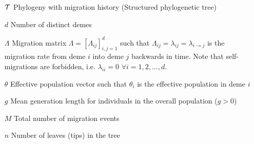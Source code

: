 \begin{itemize}
	\item[$\mathcal{T}$] Phylogeny with migration history (Structured phylogenetic tree)
	\item[$d$] Number of distinct demes
	\item[$\Lambda$] Migration matrix $\Lambda = [\Lambda_{ij}]_{i,j=1}^d$ such that $\Lambda_{ij} = \lambda_{ij} = \lambda_{i \rightarrow j}$ is the migration rate from deme $i$ into deme $j$ backwards in time. Note that self-migrations are forbidden, i.e. $\lambda_{ii} = 0$ $\forall i = 1,2, \dots, d$.
	\item[$\theta$] Effective population vector such that $\theta_i$ is the effective population in deme $i$
	\item[$g$] Mean generation length for individuals in the overall population ($g > 0$)
	\item[$M$] Total number of migration events
	\item[$n$] Number of leaves (tips) in the tree
\end{itemize}